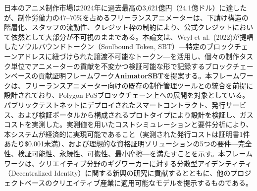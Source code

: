 
日本のアニメ制作市場は2024年に過去最高の3{,}621億円（24.1億ドル）に達したが、制作労働力の47--70\%を占めるフリーランスアニメーターは、下請け構造の階層化、スタッフの流動性、クレジット枠の制約により、公式クレジットにおいて依然として大部分が不可視のままである。本論文は、Weyl et al.~(2022)が提唱したソウルバウンドトークン（Soulbound Token, SBT）---特定のブロックチェーンアドレスに紐づけられた譲渡不可能なトークン---を活用し、個々の制作タスク単位でアニメーターの貢献を不変かつ検証可能な形で記録するブロックチェーンベースの貢献証明フレームワーク\textbf{AnimatorSBT}を提案する。本フレームワークは、フリーランスアニメーター向けの既存の制作管理ツールとの統合を前提に設計されており、Polygon PoSブロックチェーン上への展開を対象としている。パブリックテストネットにデプロイされたスマートコントラクト、発行サービス、および検証ポータルから構成されるプロトタイプにより設計を検証し、ガスコストを実測した。実測値を用いたコストシミュレーションと要件分析により、本システムが経済的に実現可能であること（実測された発行コストは証明書1件あたり\$0.001未満）、および理想的な資格証明ソリューションの5つの要件---完全性、検証可能性、永続性、可搬性、最小摩擦---を満たすことを示す。本フレームワークは、クリエイティブ分野のギグワーカーに対する分散型アイデンティティ（Decentralized Identity）に関する新興の研究に貢献するとともに、他のプロジェクトベースのクリエイティブ産業に適用可能なモデルを提示するものである。

